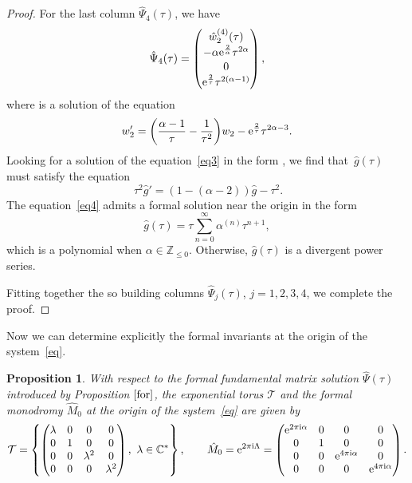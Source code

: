 \documentclass[10pt,a4paper]{amsart}
\numberwithin{equation}{section}
\newtheorem{Proposition}[Theorem]{Proposition}
 { \theoremstyle{definition}
\newtheorem{Definition}[Theorem]{Definition}
\newtheorem{Note}[Theorem]{Note}
\newtheorem{Example}[Theorem]{Example}
\newtheorem{Remark}[Theorem]{Remark} }
\begin{document}
\begin{proof}
 For the last column $\hat{\Psi}_4(\tau)$, we have
 \[
 \hat{\Psi}_4(\tau)=\begin{pmatrix}
 \hat{w}_2^{(4)}(\tau)\\[0.2ex]
 -\alpha {\rm e}^{\frac{2}{\alpha}} \tau^{2 \alpha}\\[0.2ex]
 0\\[0.2ex]
 {\rm e}^{\frac{2}{\tau}} \tau^{2 (\alpha-1)}
 	\end{pmatrix} ,
 \]
 where  is a solution of the equation
 \begin{equation}
 w_2'=\biggl(\frac{\alpha-1}{\tau} - \frac{1}{\tau^2}\biggr) w_2
 - {\rm e}^{\frac{2}{\tau}} \tau^{2 \alpha -3} .\label{eq3}
 \end{equation}
 Looking for a solution of the equation~\eqref{eq3} in the form
 , we find that~$\hat{g}(\tau)$ must satisfy the equation
 \begin{equation}\
 \tau^2 \hat{g}'=(1- (\alpha-2)) \hat{g} - \tau^2 .\label{eq4}
 \end{equation}
 The equation~\eqref{eq4} admits a formal solution near the origin in the form
 \[
 \hat{g}(\tau)=\tau \sum_{n=0}^{\infty} \alpha^{(n)} \tau^{n+1},
 \]
 which is a polynomial when $\alpha\in\mathbb{Z}_{\leq 0}$. Otherwise, $\hat{g}(\tau)$ is a divergent power series.

 Fitting together the so building columns $\hat{\Psi}_j(\tau)$, $j=1, 2, 3, 4$, we complete the proof.
 \end{proof}



 Now we can determine explicitly the formal invariants at the origin of the system~\eqref{eq}.

 \begin{Proposition}%
 With respect to the formal fundamental matrix solution $\hat{\Psi}(\tau)$ introduced by Proposition $\ref{for}$, the
 exponential torus $\mathcal{T}$ and the formal monodromy $\hat{M}_0$ at the origin of the system~\eqref{eq} are given by
 \[
 \mathcal{T}=\left\{\begin{pmatrix}
 \lambda & 0 & 0 & 0\\
 0 & 1 & 0 & 0\\
 0 & 0 & \lambda^2 & 0\\
 0 & 0 & 0 & \lambda^2
 \end{pmatrix},\ \lambda\in\mathbb{C}^*\right\},\qquad
 \hat{M}_0={\rm e}^{2 \pi {\rm i} \Lambda}=\begin{pmatrix}
 {\rm e}^{2 \pi {\rm i} \alpha} & 0 & 0 & 0\\
 0 & 1 & 0 & 0\\
 0 & 0 & {\rm e}^{4 \pi {\rm i} \alpha} & 0\\
 0 & 0 & 0 & {\rm e}^{4 \pi {\rm i} \alpha}
 \end{pmatrix} .
 \]
 \end{Proposition}
\end{document}

